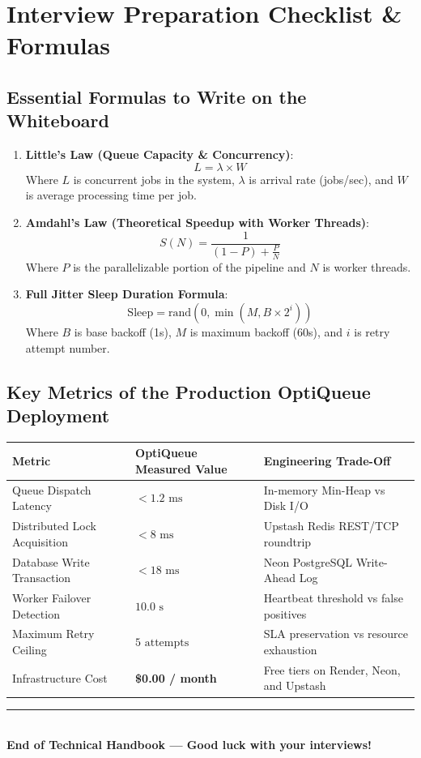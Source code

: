 \documentclass[11pt,a4paper]{article}
\begin{document}
\newpage
\section{Interview Preparation Checklist \& Formulas}

\subsection{Essential Formulas to Write on the Whiteboard}
\begin{enumerate}[leftmargin=1.5em]
    \item \textbf{Little's Law (Queue Capacity \& Concurrency)}:
    \[ L = \lambda \times W \]
    Where $L$ is concurrent jobs in the system, $\lambda$ is arrival rate (jobs/sec), and $W$ is average processing time per job.
    
    \item \textbf{Amdahl's Law (Theoretical Speedup with Worker Threads)}:
    \[ S(N) = \frac{1}{(1 - P) + \frac{P}{N}} \]
    Where $P$ is the parallelizable portion of the pipeline and $N$ is worker threads.
    
    \item \textbf{Full Jitter Sleep Duration Formula}:
    \[ \text{Sleep} = \text{rand}(0, \min(M, B \times 2^i)) \]
    Where $B$ is base backoff (1s), $M$ is maximum backoff (60s), and $i$ is retry attempt number.
\end{enumerate}

\subsection{Key Metrics of the Production OptiQueue Deployment}
\begin{center}
\begin{tabular}{lll}
\toprule
\textbf{Metric} & \textbf{OptiQueue Measured Value} & \textbf{Engineering Trade-Off} \\
\midrule
Queue Dispatch Latency & $< 1.2\text{ ms}$ & In-memory Min-Heap vs Disk I/O \\
Distributed Lock Acquisition & $< 8\text{ ms}$ & Upstash Redis REST/TCP roundtrip \\
Database Write Transaction & $< 18\text{ ms}$ & Neon PostgreSQL Write-Ahead Log \\
Worker Failover Detection & $10.0\text{ s}$ & Heartbeat threshold vs false positives \\
Maximum Retry Ceiling & $5\text{ attempts}$ & SLA preservation vs resource exhaustion \\
Infrastructure Cost & \textbf{\$0.00 / month} & Free tiers on Render, Neon, and Upstash \\
\bottomrule
\end{tabular}
\end{center}

\vspace{0.8cm}
\begin{center}
\rule{0.5\textwidth}{0.5pt}\\[0.3cm]
\textbf{End of Technical Handbook --- Good luck with your interviews!}
\end{center}
\end{document}
